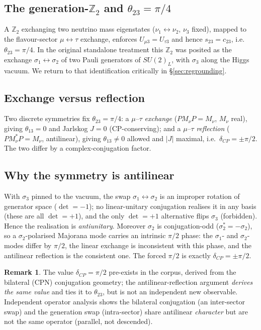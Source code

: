 \documentclass[11pt]{article}
\theoremstyle{definition}
\newtheorem{remark}{Remark}
\begin{document}
\subsection{The generation-$\mathbb{Z}_2$ and $\theta_{23}=\pi/4$}
A $\mathbb{Z}_2$ exchanging two neutrino mass eigenstates ($\nu_1\leftrightarrow\nu_2$, $\nu_3$ fixed), mapped to the flavour-sector $\mu\leftrightarrow\tau$ exchange, enforces $U_{\mu3}=U_{\tau3}$ and hence $s_{23}=c_{23}$, i.e.\ $\theta_{23}=\pi/4$. In the original standalone treatment this $\mathbb{Z}_2$ was posited as the exchange $\sigma_1\leftrightarrow\sigma_2$ of two Pauli generators of $SU(2)_L$, with $\sigma_3$ along the Higgs vacuum. We return to that identification critically in \S\ref{sec:regrounding}.

\subsection{Exchange versus reflection}
Two discrete symmetries fix $\theta_{23}=\pi/4$: a $\mu$--$\tau$ \emph{exchange} ($P M_\nu P=M_\nu$, $M_\nu$ real), giving $\theta_{13}=0$ and Jarlskog $J=0$ (CP-conserving); and a $\mu$--$\tau$ \emph{reflection} ($P M_\nu^{*} P=M_\nu$, antilinear), giving $\theta_{13}\neq0$ allowed and $|J|$ maximal, i.e.\ $\delta_{CP}=\pm\pi/2$. The two differ by a complex-conjugation factor.

\subsection{Why the symmetry is antilinear}
With $\sigma_3$ pinned to the vacuum, the swap $\sigma_1\leftrightarrow\sigma_2$ is an improper rotation of generator space ($\det=-1$); no linear-unitary conjugation realises it in any basis (these are all $\det=+1$), and the only $\det=+1$ alternative flips $\sigma_3$ (forbidden). Hence the realisation is \emph{antiunitary}. Moreover $\sigma_2$ is conjugation-odd ($\sigma_2^{*}=-\sigma_2$), so a $\sigma_2$-polarised Majorana mode carries an intrinsic $\pi/2$ phase: the $\sigma_1$- and $\sigma_2$-modes differ by $\pi/2$, the linear exchange is inconsistent with this phase, and the antilinear reflection is the consistent one. The forced $\pi/2$ is exactly $\delta_{CP}=\pm\pi/2$.

\begin{remark}
The value $\delta_{CP}=\pi/2$ pre-exists in the corpus, derived from the bilateral (CPN) conjugation geometry; the antilinear-reflection argument \emph{derives the same value} and ties it to $\theta_{23}$, but is not an independent new observable. Independent operator analysis shows the bilateral conjugation (an inter-sector swap) and the generation swap (intra-sector) share antilinear \emph{character} but are not the same operator (parallel, not descended).
\end{remark}
\end{document}
